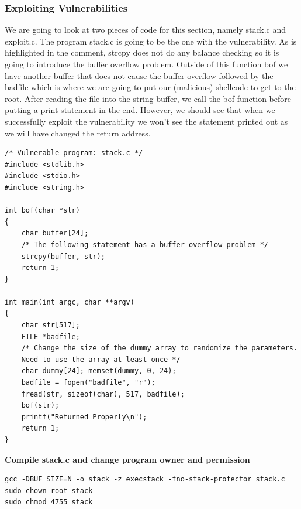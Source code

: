 \documentclass[12pt]{article}
\begin{document}
\newpage

\subsubsection{Exploiting Vulnerabilities}
We are going to look at two pieces of code for this section, namely stack.c and
exploit.c. The program stack.c is going to be the one with the vulnerability.
As is highlighted in the comment, strcpy does not do any balance checking so
it is going to introduce the buffer overflow problem. Outside of this function bof
we have another buffer that does not cause the buffer overflow followed by the
badfile which is where we are going to put our (malicious) shellcode to get to
the root. After reading the file into the string buffer, we call the bof function
before putting a print statement in the end. However, we should see that when
we successfully exploit the vulnerability we won't see the statement printed out
as we will have changed the return address.

\vspace{0.2in}

\begin{lstlisting}
/* Vulnerable program: stack.c */
#include <stdlib.h>
#include <stdio.h>
#include <string.h>

int bof(char *str)
{
    char buffer[24];
    /* The following statement has a buffer overflow problem */
    strcpy(buffer, str);
    return 1;
}

int main(int argc, char **argv)
{
    char str[517];
    FILE *badfile;
    /* Change the size of the dummy array to randomize the parameters.
    Need to use the array at least once */
    char dummy[24]; memset(dummy, 0, 24);
    badfile = fopen("badfile", "r");
    fread(str, sizeof(char), 517, badfile);
    bof(str);
    printf("Returned Properly\n");
    return 1;
}
\end{lstlisting}



\newpage

\begin{center}
    \textbf{Compile stack.c and change program owner and permission}
\end{center}

\begin{framed}
    \begin{verbatim}
gcc -DBUF_SIZE=N -o stack -z execstack -fno-stack-protector stack.c
sudo chown root stack
sudo chmod 4755 stack
    \end{verbatim}
\end{framed}
\end{document}

